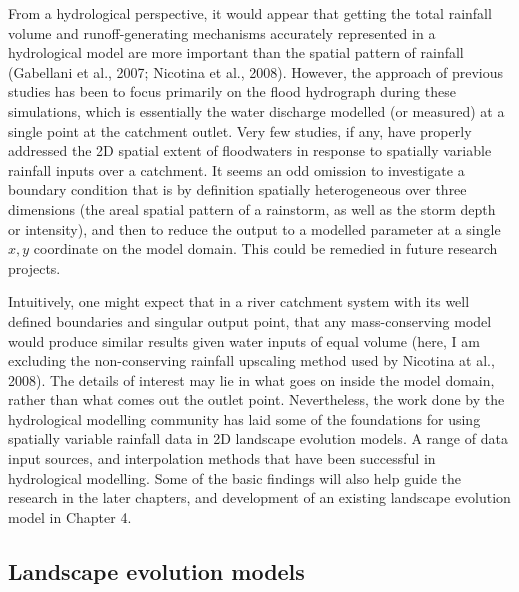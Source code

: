 From a hydrological perspective, it would appear that getting the total rainfall volume and runoff-generating mechanisms accurately represented in a hydrological model are more important than the spatial pattern of rainfall (Gabellani et al., 2007; Nicotina et al., 2008). However, the approach of previous studies has been to focus primarily on the flood hydrograph during these simulations, which is essentially the water discharge modelled (or measured) at a single point at the catchment outlet. Very few studies, if any, have properly addressed the 2D spatial extent of floodwaters in response to spatially variable rainfall inputs over a catchment. It seems an odd omission to investigate a boundary condition that is by definition spatially heterogeneous over three dimensions (the areal spatial pattern of a rainstorm, as well as the storm depth or intensity), and then to reduce the output to a modelled parameter at a single \(x,y\) coordinate on the model domain. This could be remedied in future research projects.

Intuitively, one might expect that in a river catchment system with its well defined boundaries and singular output point, that any mass-conserving model would produce similar results given water inputs of equal volume (here, I am excluding the non-conserving rainfall upscaling method used by Nicotina at al., 2008). The details of interest may lie in what goes on inside the model domain, rather than what comes out the outlet point. Nevertheless, the work done by the hydrological modelling community has laid some of the foundations for using spatially variable rainfall data in 2D landscape evolution models. A range of data input sources, and interpolation methods that have been successful in hydrological modelling. Some of the basic findings will also help guide the research in the later chapters, and development of an existing landscape evolution model in Chapter 4.

\subsection{Landscape evolution models}

